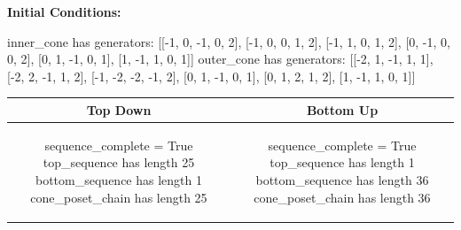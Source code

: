 \documentclass[10pt]{article}
\begin{document}
\textbf{Initial Conditions:}
\begin{SAGE}
inner_cone has generators: 
[[-1, 0, -1, 0, 2], [-1, 0, 0, 1, 2], [-1, 1, 0, 1, 2], [0, -1, 0, 0, 2], [0, 1, -1, 0, 1], [1, -1, 1, 0, 1]]
outer_cone has generators: 
[[-2, 1, -1, 1, 1], [-2, 2, -1, 1, 2], [-1, -2, -2, -1, 2], [0, 1, -1, 0, 1], [0, 1, 2, 1, 2], [1, -1, 1, 0, 1]]

\end{SAGE}
\begin{tabular}{c|c}
\textbf{Top Down} & \textbf{Bottom Up} \\ \hline  
\begin{SAGE}
sequence_complete = True
top_sequence has length 25
bottom_sequence has length 1
cone_poset_chain has length 25
\end{SAGE} 
&
\begin{SAGE}
sequence_complete = True
top_sequence has length 1
bottom_sequence has length 36
cone_poset_chain has length 36
\end{SAGE} 
\\ \hline


\end{tabular}
\end{document}
